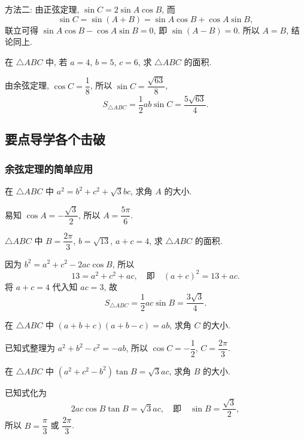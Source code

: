     方法二: 由正弦定理, $\sin C= 2\sin A\cos B$, 而
    \[\sin C= \sin(A+B)= \sin A\cos B+ \cos A\sin B,\]
    联立可得 $\sin A\cos B- \cos A\sin B= 0$, 
    即 $\sin(A-B)= 0$. 所以 $A=B$, 结论同上.
\endsolution

\begin{exercise}
    在 $\triangle ABC$ 中, 若 $a=4$, $b=5$, $c=6$, 求 $\triangle ABC$ 的面积.
\end{exercise}
\beginsolution
    由余弦定理, $\cos C= \dfrac18$, 
    所以 $\sin C= \dfrac{\sqrt{63}}8$,
    \[S_{\triangle ABC}= \frac12 ab\sin C= \frac{5\sqrt{63}}{4}.\]
\endsolution

\subsection{要点导学\quad 各个击破}
\subsubsection{余弦定理的简单应用}
\begin{example}
    在 $\triangle ABC$ 中 $a^2 =b^2+c^2+ \sqrt3 bc$, 求角 $A$ 的大小.
\end{example}
\beginsolution
    易知 $\cos A= -\dfrac{\sqrt3}2$, 所以 $A= \dfrac{5\pi}6$.
\endsolution

\begin{example}
    $\triangle ABC$ 中 $B=\dfrac{2\pi}3$, $b=\sqrt{13}$, $a+c=4$, 
    求 $\triangle ABC$ 的面积.
\end{example}
\beginsolution
    因为 $b^2= a^2+c^2- 2ac\cos B$, 所以 
    \[13= a^2+c^2+ac,\quad\text{即}\quad (a+c)^2= 13+ac.\]
    将 $a+c=4$ 代入知 $ac=3$, 故
    \[S_{\triangle ABC}= \frac12 ac\sin B= \frac{3\sqrt{3}}{4}.\]
\endsolution

\lianxi
\begin{exercise}
    在 $\triangle ABC$ 中 $(a+b+c)(a+b-c)= ab$, 求角 $C$ 的大小.
\end{exercise}
\beginsolution
    已知式整理为 $a^2+b^2- c^2= -ab$, 所以 $\cos C= -\dfrac12$, $C= \dfrac{2\pi}3$.
\endsolution

\begin{exercise}
    在 $\triangle ABC$ 中 $(a^2 +c^2 -b^2 )\tan B=\sqrt3 ac$, 求角 $B$ 的大小.
\end{exercise}
\beginsolution
    已知式化为
    \[2ac\cos B\tan B= \sqrt3 ac,\quad\text{即}\quad
        \sin B= \dfrac{\sqrt3}2,\]
    所以 $B= \dfrac\pi3$ 或 $\dfrac{2\pi}3$.
\endsolution

